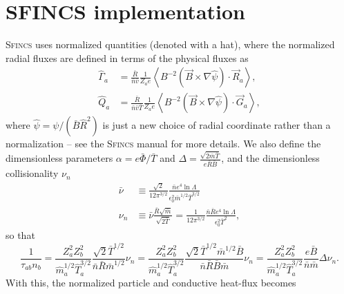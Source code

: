 \documentclass[12pt, a4paper]{article}
\newcommand{\lang}{\left\langle}
\newcommand{\rang}{\right\rangle}
\begin{document}
\section{SFINCS implementation}
\textsc{Sfincs} uses normalized quantities (denoted with a hat), where the normalized radial fluxes are defined in terms of the physical fluxes as
\begin{align}
  \hat{\Gamma}_a &= \frac{\bar{R}}{\bar{n}\bar{v}} \frac{1}{Z_a e} \lang B^{-2} \left(\vec{B} \times \nabla \hat{\psi}\right) \cdot \vec{R}_a \rang, \\
  \hat{Q}_a &= \frac{\bar{R}}{\bar{n}\bar{v} \bar{T}} \frac{1}{Z_a e} \lang B^{-2} \left(\vec{B} \times \nabla \hat{\psi}\right) \cdot \vec{G}_a \rang,
\end{align}
where $\hat{\psi} = \psi/(\bar{B}\hat{R}^2)$ is just a new choice of radial coordinate rather than a normalization -- see the \textsc{Sfincs} manual for more details. We also define the dimensionless parameters $\alpha = e\bar{\Phi}/\bar{T}$ and $\Delta = \frac{\sqrt{2\bar{m}\bar{T}}}{e\bar{R}\bar{B}}$, and the dimensionless collisionality $\nu_n$
\begin{align}
  \bar{\nu} &\equiv \frac{\sqrt{2}}{12 \pi^{3/2}} \frac{\bar{n} e^4 \ln \Lambda}{\epsilon_0^2 \bar{m}^{1/2} \bar{T}^{3/2}} \\
  \nu_n &\equiv \bar{\nu} \frac{\bar{R} \sqrt{\bar{m}}}{\sqrt{2\bar{T}}} =\frac{1}{12 \pi^{3/2}} \frac{\bar{n} \bar{R} e^4 \ln \Lambda}{\epsilon_0^2 \bar{T}^{2}},
\end{align}
so that
\begin{equation}
\frac{1}{\tau_{ab} n_b} = \frac{Z_a^2 Z_b^2}{\hat{m}_a^{1/2} \hat{T}_a^{3/2}} \frac{\sqrt{2} \bar{T}^{1/2}}{\bar{n} \bar{R} \bar{m}^{1/2}} \nu_n = \frac{Z_a^2 Z_b^2}{\hat{m}_a^{1/2} \hat{T}_a^{3/2}} \frac{\sqrt{2} \bar{T}^{1/2}\bar{m}^{1/2} \bar{B}}{\bar{n} \bar{R} \bar{B} \bar{m}} \nu_n = \frac{Z_a^2 Z_b^2}{\hat{m}_a^{1/2} \hat{T}_a^{3/2}} \frac{e\bar{B}}{\bar{n}\bar{m}} \Delta \nu_n.
\end{equation}
With this, the normalized particle and conductive heat-flux becomes
\end{document}
